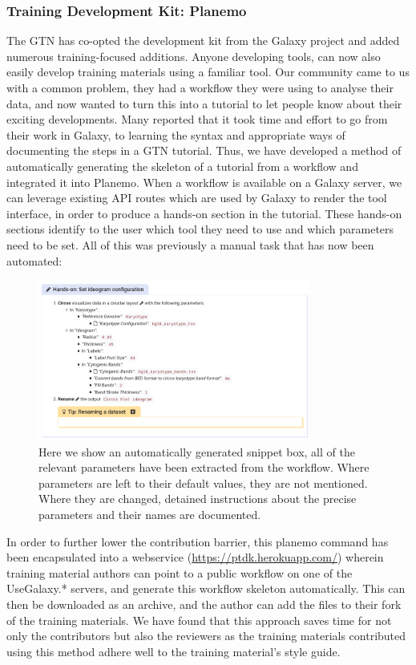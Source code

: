\documentclass[10pt,letterpaper]{article}
\begin{document}
\subsubsection*{Training Development Kit: Planemo}
The GTN has co-opted the development kit from the Galaxy project and added numerous training-focused additions. Anyone developing tools, can now also easily develop training materials using a familiar tool.
Our community came to us with a common problem, they had a workflow they were using to analyse their data, and now wanted to turn this into a tutorial to let people know about their exciting developments.
Many reported that it took time and effort to go from their work in Galaxy, to learning the syntax and appropriate ways of documenting the steps in a GTN tutorial.
Thus, we have developed a method of automatically generating the skeleton of a tutorial from a workflow and integrated it into Planemo.
When a workflow is available on a Galaxy server, we can leverage existing API routes which are used by Galaxy to render the tool interface, in order to produce a hands-on section in the tutorial.
These hands-on sections identify to the user which tool they need to use and which parameters need to be set.
All of this was previously a manual task that has now been automated:

\begin{figure}[!ht]
	\centering
	\includegraphics[width=0.8\textwidth]{images/tool-in-tutorial.png}
	\caption{Here we show an automatically generated snippet box, all of the relevant parameters have been extracted from the workflow. Where parameters are left to their default values, they are not mentioned. Where they are changed, detained instructions about the precise parameters and their names are documented.\label{fig:planemo}}
\end{figure}

In order to further lower the contribution barrier, this planemo command has been encapsulated into a webservice (\url{https://ptdk.herokuapp.com/}) wherein training material authors can point to a public workflow on one of the UseGalaxy.* servers, and generate this workflow skeleton automatically. This can then be downloaded as an archive, and the author can add the files to their fork of the training materials.
We have found that this approach saves time for not only the contributors but also the reviewers as the training materials contributed using this method adhere well to the training material’s style guide.
\end{document}
